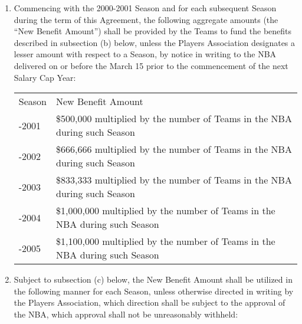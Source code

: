\documentclass[
]{book}
\begin{document}
\begin{enumerate}
\def\labelenumi{(\alph{enumi})}
\item
  Commencing with the 2000-2001 Season and for each subsequent Season during the term of this Agreement, the following aggregate amounts (the ``New Benefit Amount'') shall be provided by the Teams to fund the benefits described in subsection (b) below, unless the Players Association designates a lesser amount with respect to a Season, by notice in writing to the NBA delivered on or before the March 15 prior to the commencement of the next Salary Cap Year:

  \begin{longtable}[]{@{}
    >{\raggedright\arraybackslash}p{}
    >{\centering\arraybackslash}p{}@{}}
  \toprule()
  \endhead
  Season & New Benefit Amount \\
  2000-2001 & \$500,000 multiplied by the number of Teams in the NBA during such Season \\
  2001-2002 & \$666,666 multiplied by the number of Teams in the NBA during such Season \\
  2002-2003 & \$833,333 multiplied by the number of Teams in the NBA during such Season \\
  2003-2004 & \$1,000,000 multiplied by the number of Teams in the NBA during such Season \\
  2004-2005 & \$1,100,000 multiplied by the number of Teams in the NBA during such Season \\
  \bottomrule()
  \end{longtable}
\item
  Subject to subsection (c) below, the New Benefit Amount shall be utilized in the following manner for each Season, unless otherwise directed in writing by the Players Association, which direction shall be subject to the approval of the NBA, which approval shall not be unreasonably withheld:


\end{enumerate}
\end{document}
